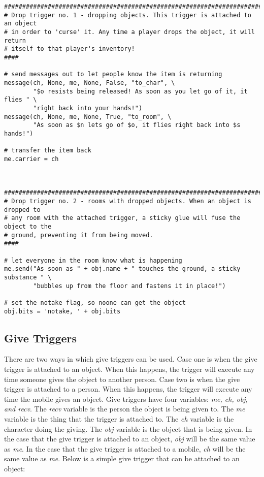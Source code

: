 \documentclass[12pt]{article}
\begin{document}
{\bf \begin{verbatim}
################################################################################
# Drop trigger no. 1 - dropping objects. This trigger is attached to an object
# in order to 'curse' it. Any time a player drops the object, it will return
# itself to that player's inventory!
####

# send messages out to let people know the item is returning
message(ch, None, me, None, False, "to_char", \
	    "$o resists being released! As soon as you let go of it, it flies " \
	    "right back into your hands!")
message(ch, None, me, None, True, "to_room", \
	    "As soon as $n lets go of $o, it flies right back into $s hands!")
              
# transfer the item back
me.carrier = ch



################################################################################
# Drop trigger no. 2 - rooms with dropped objects. When an object is dropped to
# any room with the attached trigger, a sticky glue will fuse the object to the
# ground, preventing it from being moved.
####

# let everyone in the room know what is happening
me.send("As soon as " + obj.name + " touches the ground, a sticky substance " \
        "bubbles up from the floor and fastens it in place!")
        
# set the notake flag, so noone can get the object
obj.bits = 'notake, ' + obj.bits
\end{verbatim}}



\subsection{Give Triggers}
There are two ways in which give triggers can be used. Case one is when the give trigger is attached to an object. When this happens, the trigger will execute any time someone gives the object to another person. Case two is when the give trigger is attached to a person. When this happens, the trigger will execute any time the mobile gives an object. Give triggers have four variables: {\it me, ch, obj, and recv}. The {\it recv} variable is the person the object is being given to. The {\it me} variable is the thing that the trigger is attached to. The {\it ch} variable is the character doing the giving. The {\it obj} variable is the object that is being given. In the case that the give trigger is attached to an object, {\it obj} will be the same value as {\it me}. In the case that the give trigger is attached to a mobile, {\it ch} will be the same value as {\it me}.  Below is a simple give trigger that can be attached to an object:
\end{document}
